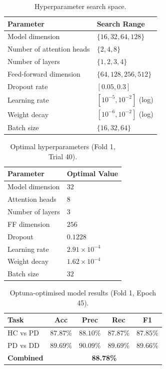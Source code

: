 \documentclass[conference]{IEEEtran}
\begin{document}
\begin{table}[H]
\centering
\caption{Hyperparameter search space.}
\label{tab:optuna_search}
\begin{tabular}{ll}
\toprule
\textbf{Parameter} & \textbf{Search Range} \\
\midrule
Model dimension              & $\{16, 32, 64, 128\}$     \\
Number of attention heads    & $\{2, 4, 8\}$             \\
Number of layers             & $\{1, 2, 3, 4\}$          \\
Feed-forward dimension       & $\{64, 128, 256, 512\}$   \\
Dropout rate                 & $[0.05, 0.3]$             \\
Learning rate                & $[10^{-5}, 10^{-2}]$ (log) \\
Weight decay                 & $[10^{-6}, 10^{-2}]$ (log) \\
Batch size                   & $\{16, 32, 64\}$          \\
\bottomrule
\end{tabular}
\end{table}

\begin{table}[H]
\centering
\caption{Optimal hyperparameters (Fold 1, Trial 40).}
\label{tab:optuna_best}
\begin{tabular}{ll}
\toprule
\textbf{Parameter} & \textbf{Optimal Value} \\
\midrule
Model dimension       & $32$             \\
Attention heads       & $8$              \\
Number of layers      & $3$              \\
FF dimension          & $256$            \\
Dropout               & $0.1228$         \\
Learning rate         & $2.91 \times 10^{-4}$  \\
Weight decay          & $1.62 \times 10^{-4}$  \\
Batch size            & $32$             \\
\bottomrule
\end{tabular}
\end{table}

\begin{table}[H]
\centering
\caption{Optuna-optimised model results (Fold 1, Epoch 45).}
\label{tab:optuna_results}
\begin{tabular}{lcccc}
\toprule
\textbf{Task} & \textbf{Acc} & \textbf{Prec} & \textbf{Rec} & \textbf{F1} \\
\midrule
HC vs PD & $87.87\%$ & $88.10\%$ & $87.87\%$ & $87.85\%$ \\
PD vs DD & $89.69\%$ & $90.09\%$ & $89.69\%$ & $89.66\%$ \\
\midrule
\textbf{Combined} & \multicolumn{4}{c}{\textbf{88.78\%}} \\
\bottomrule
\end{tabular}
\end{table}
\end{document}
